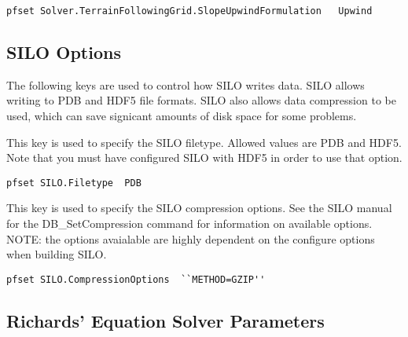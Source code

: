 \begin{display}\begin{verbatim}
pfset Solver.TerrainFollowingGrid.SlopeUpwindFormulation   Upwind
\end{verbatim}\end{display}


\subsection{SILO Options}
\label{SILO Options}

The following keys are used to control how SILO writes data.  SILO
 allows writing to PDB and HDF5 file formats.  SILO also allows data
 compression to be used, which can save signicant amounts of disk
 space for some problems.

{
This key is used to specify the SILO filetype.   Allowed values are PDB and HDF5.  Note that you must have configured SILO with HDF5 in order to use that option.}
\begin{display}\begin{verbatim}
pfset SILO.Filetype  PDB
\end{verbatim}\end{display}


{
This key is used to specify the SILO compression options. See the SILO manual for the
 DB\_SetCompression command for information on available options.   NOTE: the options avaialable are highly dependent on the configure options when building SILO.}
\begin{display}\begin{verbatim}
pfset SILO.CompressionOptions  ``METHOD=GZIP''
\end{verbatim}\end{display}



\subsection{Richards' Equation Solver Parameters}
\label{RE Solver Parameters}

